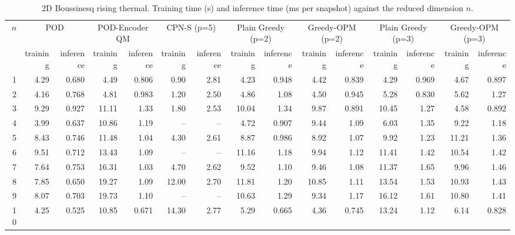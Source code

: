 \begin{table}[tb]
  \centering
  \caption{2D Boussinesq rising thermal. Training time (s) and inference time (ms per snapshot) against the reduced dimension \( n \).}
  \label{tab:boussinesq_timings}
  \small
  \setlength{\tabcolsep}{4pt}
  \begin{tabular}{rrrrrrrrrrrrrrr}
    \toprule
    \multirow{2}{*}{\( n \)} & \multicolumn{2}{c}{POD} & \multicolumn{2}{c}{POD-Encoder QM} & \multicolumn{2}{c}{CPN-S (p=5)} & \multicolumn{2}{c}{Plain Greedy (p=2)} & \multicolumn{2}{c}{Greedy-OPM (p=2)} & \multicolumn{2}{c}{Plain Greedy (p=3)} & \multicolumn{2}{c}{Greedy-OPM (p=3)} \\
    \cmidrule(lr){2-3} \cmidrule(lr){4-5} \cmidrule(lr){6-7} \cmidrule(lr){8-9} \cmidrule(lr){10-11} \cmidrule(lr){12-13} \cmidrule(lr){14-15}
     & training & inference & training & inference & training & inference & training & inference & training & inference & training & inference & training & inference \\
    \midrule
    1 & 4.29 & 0.680 & 4.49 & 0.806 & 0.90 & 2.81 & 4.23 & 0.948 & 4.42 & 0.839 & 4.29 & 0.969 & 4.67 & 0.897 \\
    2 & 4.16 & 0.768 & 4.81 & 0.983 & 1.20 & 2.50 & 4.86 & 1.08 & 4.50 & 0.945 & 5.28 & 0.830 & 5.62 & 1.27 \\
    3 & 9.29 & 0.927 & 11.11 & 1.33 & 1.80 & 2.53 & 10.04 & 1.34 & 9.87 & 0.891 & 10.45 & 1.27 & 4.58 & 0.892 \\
    4 & 3.99 & 0.637 & 10.86 & 1.19 & -- & -- & 4.72 & 0.907 & 9.44 & 1.09 & 6.03 & 1.35 & 9.22 & 1.18 \\
    5 & 8.43 & 0.746 & 11.48 & 1.04 & 4.30 & 2.61 & 8.87 & 0.986 & 8.92 & 1.07 & 9.92 & 1.23 & 11.21 & 1.36 \\
    6 & 9.51 & 0.712 & 13.43 & 1.09 & -- & -- & 11.16 & 1.18 & 9.94 & 1.12 & 11.41 & 1.42 & 10.54 & 1.42 \\
    7 & 7.64 & 0.753 & 16.31 & 1.03 & 4.70 & 2.62 & 9.52 & 1.10 & 9.46 & 1.08 & 11.37 & 1.65 & 9.96 & 1.46 \\
    8 & 7.85 & 0.650 & 19.27 & 1.09 & 12.00 & 2.70 & 11.81 & 1.20 & 10.85 & 1.11 & 13.54 & 1.53 & 10.93 & 1.43 \\
    9 & 8.07 & 0.703 & 19.73 & 1.10 & -- & -- & 10.63 & 1.29 & 9.34 & 1.17 & 16.12 & 1.61 & 10.80 & 1.41 \\
    10 & 4.25 & 0.525 & 10.85 & 0.671 & 14.30 & 2.77 & 5.29 & 0.665 & 4.36 & 0.745 & 13.24 & 1.12 & 6.14 & 0.828 \\
    \bottomrule
  \end{tabular}
\end{table}
